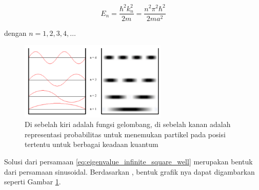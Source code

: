 \begin{equation} \label{eq:eigenvalue_infinite_square_well}
	E_n = \frac{\hbar^2 k_n^2}{2m} = \frac{n^2 \pi^2 \hbar^2}{2ma^2}
\end{equation}

dengan $n = 1, 2, 3, 4, \dots$

\begin{figure}[H]
	\centering
	\includegraphics[width=7cm]{images/solution_infinte_square_well.png}
	\caption{Di sebelah kiri adalah fungsi gelombang, di sebelah kanan adalah representasi probabilitas untuk menemukan partikel pada posisi tertentu untuk berbagai keadaan kuantum}
	\label{img:solution_infinite_square_well}
\end{figure}

\noindent
Solusi dari persamaan \ref{eq:eigenvalue_infinite_square_well} merupakan bentuk dari
persamaan sinusoidal. Berdasarkan \cite{dalessandrisSpiralModernPhysics2024},
bentuk grafik nya dapat digambarkan seperti Gambar \ref{img:solution_infinite_square_well}.





